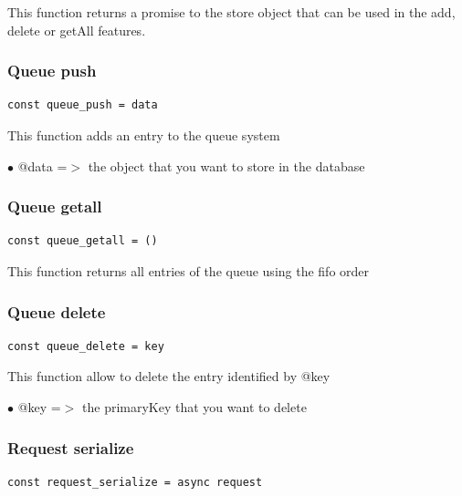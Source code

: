 \documentclass[a4paper]{article}
\begin{document}
This function returns a promise to the store object that can be used
in the add, delete or getAll features.

\hypertarget{toc268}{}
\subsubsection{Queue push}

\begin{lstlisting}
const queue_push = data
\end{lstlisting}

This function adds an entry to the queue system

\begin{compactitem}
\item[\color{myblue}$\bullet$] @data =$>$ the object that you want to store in the database
\end{compactitem}

\hypertarget{toc269}{}
\subsubsection{Queue getall}

\begin{lstlisting}
const queue_getall = ()
\end{lstlisting}

This function returns all entries of the queue using the fifo
order

\hypertarget{toc270}{}
\subsubsection{Queue delete}

\begin{lstlisting}
const queue_delete = key
\end{lstlisting}

This function allow to delete the entry identified by @key

\begin{compactitem}
\item[\color{myblue}$\bullet$] @key =$>$ the primaryKey that you want to delete
\end{compactitem}

\hypertarget{toc271}{}
\subsubsection{Request serialize}

\begin{lstlisting}
const request_serialize = async request
\end{lstlisting}
\end{document}
